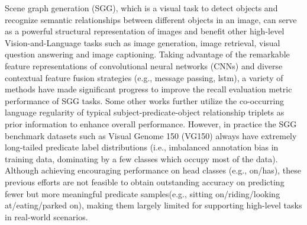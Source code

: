 \documentclass[sigconf]{acmart}
\begin{document}
Scene graph generation (SGG)\cite{scene_graph}, which is a visual task to detect objects and recognize semantic relationships between different objects in an image, can serve as a powerful structural representation of images and benefit other high-level Vision-and-Language tasks such as image generation\cite{johnson18,tripathi19,yikang19}, image retrieval\cite{scene_graph,wang20,ramnath19,schroeder20}, visual question answering\cite{yang18,ghosh19,lee19} and image captioning\cite{li19,gu19,yang19}. Taking advantage of the remarkable feature representations of convolutional neural networks (CNNs)\cite{CNN} and diverse contextual feature fusion strategies (e.g., message passing\cite{xu17,li18}, lstm\cite{zellers18}), a variety of methods have made significant progress to improve the recall evaluation metric performance of SGG tasks. Some other works\cite{chen19,tang19} further utilize the co-occurring 
language regularity of typical subject-predicate-object relationship triplets as prior information to enhance overall performance. 
However, in practice the SGG benchmark datasets such as Visual Genome 150 (VG150)\cite{krishna17,xu17} always have extremely long-tailed predicate label distributions (i.e., imbalanced annotation bias in training data, dominating by a few classes which occupy most of the data). Although achieving encouraging performance on head classes (e.g., on/has), these previous efforts are not feasible to obtain outstanding accuracy on predicting fewer but more meaningful predicate samples(e.g., sitting on/riding/looking at/eating/parked on), making them largely limited for supporting high-level tasks in real-world scenarios.
\end{document}
